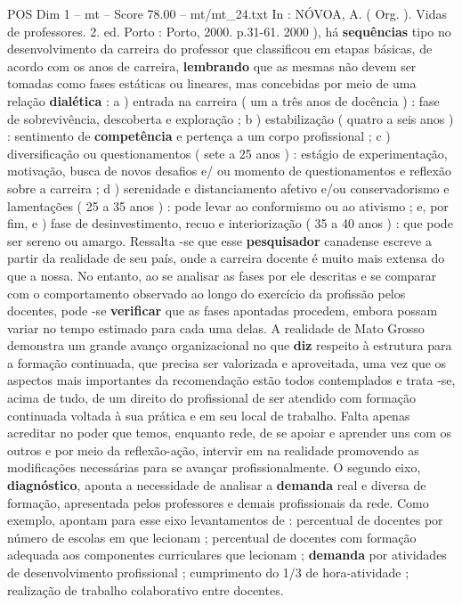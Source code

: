\begin{textsample}{POS Dim 1 – mt – Score 78.00 – mt/mt\_24.txt}
In : NÓVOA, A. ( Org. ).
Vidas de professores. 2. ed.
Porto : Porto, 2000. p.31-61. 2000 ), há \textbf{sequências} tipo no desenvolvimento da carreira do professor que classificou em etapas básicas, de acordo com os anos de carreira, \textbf{lembrando} que as mesmas não devem ser tomadas como fases estáticas ou lineares, mas concebidas por meio de uma relação \textbf{dialética} : a ) entrada na carreira ( um a três anos de docência ) : fase de sobrevivência, descoberta e exploração ; b ) estabilização ( quatro a seis anos ) : sentimento de \textbf{competência} e pertença a um corpo profissional ; c ) diversificação ou questionamentos ( sete a 25 anos ) : estágio de experimentação, motivação, busca de novos desafios e/ ou momento de questionamentos e reflexão sobre a carreira ; d ) serenidade e distanciamento afetivo e/ou conservadorismo e lamentações ( 25 a 35 anos ) : pode levar ao conformismo ou ao ativismo ; e, por fim, e ) fase de desinvestimento, recuo e interiorização ( 35 a 40 anos ) : que pode ser sereno ou amargo.
Ressalta -se que esse \textbf{pesquisador} canadense escreve a partir da realidade de seu país, onde a carreira docente é muito mais extensa do que a nossa.
No entanto, ao se analisar as fases por ele descritas e se comparar com o comportamento observado ao longo do exercício da profissão pelos docentes, pode -se \textbf{verificar} que as fases apontadas procedem, embora possam variar no tempo estimado para cada uma delas.
A realidade de Mato Grosso demonstra um grande avanço organizacional no que \textbf{diz} respeito à estrutura para a formação continuada, que precisa ser valorizada e aproveitada, uma vez que os aspectos mais importantes da recomendação estão todos contemplados e trata -se, acima de tudo, de um direito do profissional de ser atendido com formação continuada voltada à sua prática e em seu local de trabalho.
Falta apenas acreditar no poder que temos, enquanto rede, de se apoiar e aprender uns com os outros e por meio da reflexão-ação, intervir em na realidade promovendo as modificações necessárias para se avançar profissionalmente.
O segundo eixo, \textbf{diagnóstico}, aponta a necessidade de analisar a \textbf{demanda} real e diversa de formação, apresentada pelos professores e demais profissionais da rede.
Como exemplo, apontam para esse eixo levantamentos de : percentual de docentes por número de escolas em que lecionam ; percentual de docentes com formação adequada aos componentes curriculares que lecionam ; \textbf{demanda} por atividades de desenvolvimento profissional ; cumprimento do 1/3 de hora-atividade ; realização de trabalho colaborativo entre docentes.

\end{textsample}

